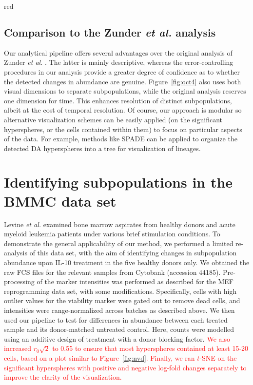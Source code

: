 \documentclass{article}
\newcommand\revised[1]{\textcolor{red}{#1}}
\begin{document}
\begin{color}{red}
\subsection{Comparison to the Zunder \textit{et al.} analysis}
Our analytical pipeline offers several advantages over the original analysis of Zunder \emph{et al.} \cite{zunder2015continuous}.
The latter is mainly descriptive, whereas the error-controlling procedures in our analysis provide a greater degree of confidence as to whether the detected changes in abundance are genuine.
Figure~\ref{fig:oct4} also uses both visual dimensions to separate subpopulations, while the original analysis reserves one dimension for time.
This enhances resolution of distinct subpopulations, albeit at the cost of temporal resolution.
Of course, our approach is modular so alternative visualization schemes can be easily applied (on the significant hyperspheres, or the cells contained within them) to focus on particular aspects of the data.
For example, methods like SPADE can be applied to organize the detected DA hyperspheres into a tree for visualization of lineages.
\end{color}

\section{Identifying subpopulations in the BMMC data set}
\label{sec:bmmc}
Levine \textit{et al.} \cite{levine2015datadriven} examined bone marrow aspirates from healthy donors and acute myeloid leukemia patients under various brief stimulation conditions.
To demonstrate the general applicability of our method, we performed a limited re-analysis of this data set, with the aim of identifying changes in subpopulation abundance upon IL-10 treatment in the five healthy donors only.
We obtained the raw FCS files for the relevant samples from Cytobank (accession 44185).
Pre-processing of the marker intensities was performed as described for the MEF reprogramming data set, with some modifications.
Specifically, cells with high outlier values for the viability marker were gated out to remove dead cells, and intensities were range-normalized across batches as described above.
We then used our pipeline to test for differences in abundance between each treated sample and its donor-matched untreated control.
Here, counts were modelled using an additive design of treatment with a donor blocking factor.
\revised{We also increased $r_0\sqrt{2}$ to 0.55 to ensure that most hyperspheres contained at least 15-20 cells, based on a plot similar to Figure~\ref{fig:nvd}.
Finally, we ran $t$-SNE on the significant hyperspheres with positive and negative log-fold changes separately to improve the clarity of the visualization.}
\end{document}
